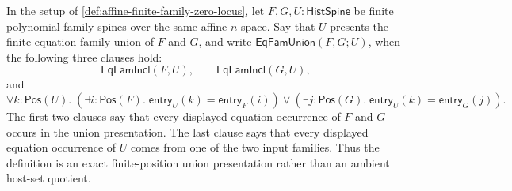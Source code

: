 \begin{definition}
\label{def:affine-finite-family-equation-union-presentation}
In the setup of \autoref{def:affine-finite-family-zero-locus}, let $F,G,U:\mathsf{HistSpine}$ be finite polynomial-family spines over the same affine $n$-space. Say that $U$ presents the finite equation-family union of $F$ and $G$, and write $\mathsf{EqFamUnion}(F,G;U)$, when the following three clauses hold:
$$
\mathsf{EqFamIncl}(F,U),
\qquad
\mathsf{EqFamIncl}(G,U),
$$
and
$$
\forall k:\mathsf{Pos}(U).\;
\left(\exists i:\mathsf{Pos}(F).\;
\mathsf{entry}_{U}(k)=\mathsf{entry}_{F}(i)\right)
\lor
\left(\exists j:\mathsf{Pos}(G).\;
\mathsf{entry}_{U}(k)=\mathsf{entry}_{G}(j)\right).
$$
The first two clauses say that every displayed equation occurrence of $F$ and $G$ occurs in the union presentation. The last clause says that every displayed equation occurrence of $U$ comes from one of the two input families. Thus the definition is an exact finite-position union presentation rather than an ambient host-set quotient.
\end{definition}

